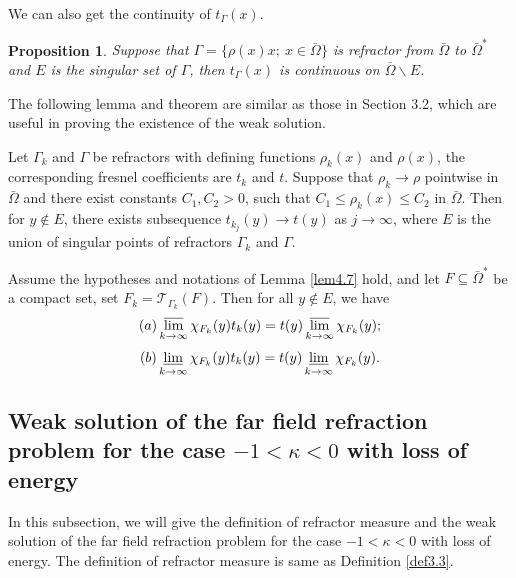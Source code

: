 \documentclass[a4paper,12pt,]{article}
\newtheorem{theorem}{\hskip\parindent\bf Theorem}[section]%
\newtheorem{lemma}{\hskip\parindent\bf Lemma}[section]%
\newtheorem{proposition}{\bf Proposition}[section]%
\numberwithin{equation}{section}
\numberwithin{equation}{section} \allowdisplaybreaks
\begin{document}
 We can also get the continuity of $t_{\Gamma}(x)$.

 \begin{proposition}
   Suppose that $\Gamma = \{\rho(x)x;~x\in \bar{\Omega}\}$ is refractor from $\bar{\Omega}$ to $\bar{\Omega}^{\ast}$ and $E$ is the singular set of $\Gamma$, then $t_{\Gamma}(x)$ is continuous on $\bar{\Omega}\backslash E$.
   \label{prop4.2}
 \end{proposition}

 The following lemma and theorem are similar as those in Section 3.2, which are useful in proving the existence of the weak solution.

 \begin{lemma}
   Let $\Gamma_{k}$ and $\Gamma$ be refractors with defining functions $\rho_{k}(x)$ and $\rho(x)$, the corresponding fresnel coefficients are $t_{k}$ and $t$. Suppose that $\rho_{k}\rightarrow \rho$ pointwise in $\bar{\Omega}$ and there exist constants $C_{1},C_{2}>0$, such that $C_{1} \leq \rho_{k}(x) \leq C_{2}$ in $\bar{\Omega}$. Then for $y \notin E$, there exists subsequence $t_{k_{j}}(y)\rightarrow t(y)$ as $j\rightarrow \infty$, where $E$ is the union of singular points of refractors $\Gamma_{k}$ and $\Gamma$.
   \label{lem4.7}
 \end{lemma}

 \begin{theorem}
   Assume the hypotheses and notations of Lemma \ref{lem4.7} hold, and let $F \subseteq \bar{\Omega}^{\ast}$ be a compact set, set $F_{k} = \mathcal{T}_{\Gamma_{k}}(F)$. Then for all $y \notin E$, we have
  \begin{equation}\label{4.4}
    (a) \varlimsup_{k \rightarrow \infty} \chi_{F_{k}}(y)t_{k}(y) = t(y)\varlimsup_{k \rightarrow \infty} \chi_{F_{k}}(y);
  \end{equation}
  \begin{equation}\label{4.5}
    (b) \varliminf_{k \rightarrow \infty} \chi_{F_{k}}(y)t_{k}(y) = t(y)\varliminf_{k \rightarrow \infty} \chi_{F_{k}}(y).
  \end{equation}
   \label{thm4.1}
 \end{theorem}

\subsection{Weak solution of the far field refraction problem for the case $-1< \kappa <0$ with loss of energy}

In this subsection, we will give the definition of refractor measure and the weak solution of the far field refraction problem for the case $-1< \kappa <0$ with loss of energy. The definition of refractor measure is same as Definition \ref{def3.3}.
\end{document}

